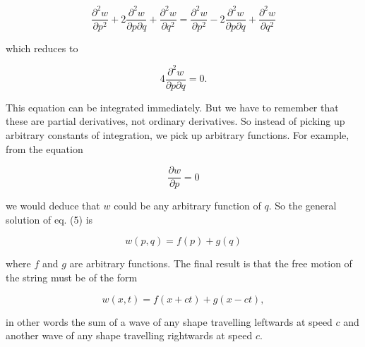  \begin{equation*}\frac{\partial^2 w}{\partial p^2}+2\frac{\partial^2 
  w}{\partial p \partial q}+\frac{\partial^2 w}{\partial q^2} = 
  \frac{\partial^2 w}{\partial p^2}-2\frac{\partial^2 w}{\partial p \partial 
  q}+\frac{\partial^2 w}{\partial q^2}\end{equation*} 

  \noindent{}which reduces to 

  \begin{equation*}4\frac{\partial^2 w}{\partial p \partial 
  q}=0.\tag{5}\end{equation*} 

  This equation can be integrated immediately. But we have to remember that 
  these are partial derivatives, not ordinary derivatives. So instead of 
  picking up arbitrary constants of integration, we pick up arbitrary 
  functions. For example, from the equation 

  \begin{equation*}\frac{\partial w}{\partial p}=0\end{equation*} 

  \noindent{}we would deduce that $w$ could be any arbitrary function of $q$. 
  So the general solution of eq. (5) is 

  \begin{equation*}w(p,q) = f(p) +g(q)\end{equation*} 

  \noindent{}where $f$ and $g$ are arbitrary functions. The final result is 
  that the free motion of the string must be of the form 

  \begin{equation*}w(x,t) = f(x+ct) + g(x-ct),\tag{6}\end{equation*} 

  \noindent{}in other words the sum of a wave of any shape travelling leftwards 
  at speed $c$ and another wave of any shape travelling rightwards at speed 
  $c$. 